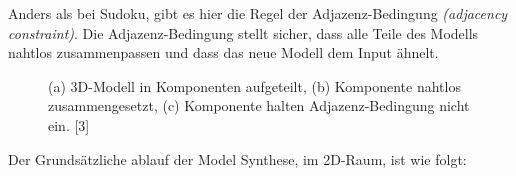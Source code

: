 \documentclass[12pt, a4paper,twoside,openright]{report}
\begin{document}
Anders als bei Sudoku, gibt es hier die Regel der Adjazenz-Bedingung \textit{(adjacency constraint)}.
Die Adjazenz-Bedingung stellt sicher, dass alle Teile des Modells nahtlos zusammenpassen und dass das neue Modell dem Input ähnelt.

\begin{figure}[H]
    \centering
    \qquad
    \qquad
    \caption{(a) 3D-Modell in Komponenten aufgeteilt, (b) Komponente nahtlos zusammengesetzt, (c) Komponente halten Adjazenz-Bedingung nicht ein. [3]}%
\end{figure}

Der Grundsätzliche ablauf der Model Synthese, im 2D-Raum, ist wie folgt:
\end{document}
